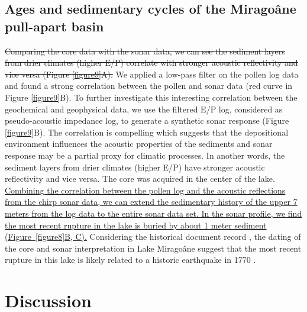 \documentclass[linenumbers,draft]{agujournal}
\begin{document}
\subsection{Ages and sedimentary cycles of the Mirago\^ane pull-apart basin}
\st{Comparing the core data with the sonar data, we can see the sediment layers from drier climates (higher E/P) correlate with stronger acoustic reflectivity and vice versa (Figure {\ref{figure9}}A).} We applied a low-pass filter on the pollen log data and found a strong correlation between the pollen and sonar data (red curve in Figure \ref{figure9}B). To further investigate this interesting correlation between the geochemical and geophysical data, we use the filtered E/P log, considered as pseudo-acoustic impedance log, to generate a synthetic sonar response (Figure \ref{figure9}B). The correlation is compelling which suggests that the depositional environment influences the acoustic properties of the sediments and sonar response may be a partial proxy for climatic processes. In another words, the sediment layers from drier climates (higher E/P) have stronger acoustic reflectivity and vice versa. The core was acquired in the center of the lake. \ul{Combining the correlation between the pollen log and the acoustic reflections from the chirp sonar data, we can extend the sedimentary history of the upper 7 meters from the log data to the entire sonar data set. In the sonar profile, we find the most recent rupture in the lake is buried by about 1 meter sediment (Figure~{\ref{figure8}}B, C).} Considering the historical document record \citep{bakun2012significant}, the dating of the core and sonar interpretation in Lake Mirago\^ane suggest that the most recent rupture in this lake is likely related to a historic earthquake in 1770 \citep{bakun2012significant}.

\section{Discussion}
\end{document}
